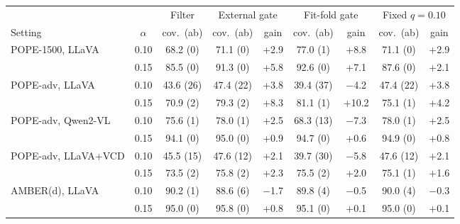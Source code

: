 \begin{tabular}{lcccccccc}
\toprule
 & & Filter & \multicolumn{2}{c}{External gate} & \multicolumn{2}{c}{Fit-fold gate} & \multicolumn{2}{c}{Fixed $q{=}0.10$}\\
\cmidrule(lr){4-5}\cmidrule(lr){6-7}\cmidrule(lr){8-9}
Setting & $\alpha$ & cov.\ (ab) & cov.\ (ab) & gain & cov.\ (ab) & gain & cov.\ (ab) & gain\\
\midrule
POPE-1500, LLaVA & 0.10 & 68.2 (0) & 71.1 (0) & +2.9 & 77.0 (1) & +8.8 & 71.1 (0) & +2.9\\
 & 0.15 & 85.5 (0) & 91.3 (0) & +5.8 & 92.6 (0) & +7.1 & 87.6 (0) & +2.1\\
\addlinespace
POPE-adv, LLaVA & 0.10 & 43.6 (26) & 47.4 (22) & +3.8 & 39.4 (37) & $-$4.2 & 47.4 (22) & +3.8\\
 & 0.15 & 70.9 (2) & 79.3 (2) & +8.3 & 81.1 (1) & +10.2 & 75.1 (1) & +4.2\\
\addlinespace
POPE-adv, Qwen2-VL & 0.10 & 75.6 (1) & 78.0 (1) & +2.5 & 68.3 (13) & $-$7.3 & 78.0 (1) & +2.5\\
 & 0.15 & 94.1 (0) & 95.0 (0) & +0.9 & 94.7 (0) & +0.6 & 94.9 (0) & +0.8\\
\addlinespace
POPE-adv, LLaVA+VCD & 0.10 & 45.5 (15) & 47.6 (12) & +2.1 & 39.7 (30) & $-$5.8 & 47.6 (12) & +2.1\\
 & 0.15 & 73.5 (2) & 75.8 (2) & +2.3 & 75.5 (2) & +2.0 & 75.1 (1) & +1.6\\
\addlinespace
AMBER(d), LLaVA & 0.10 & 90.2 (1) & 88.6 (6) & $-$1.7 & 89.8 (4) & $-$0.5 & 90.0 (4) & $-$0.3\\
 & 0.15 & 95.0 (0) & 95.8 (0) & +0.8 & 95.1 (0) & +0.1 & 95.0 (0) & +0.1\\
\bottomrule
\end{tabular}
